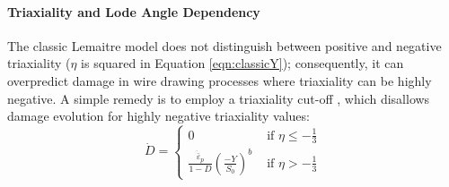 \documentclass[sn-mathphys,Numbered,draft]{sn-jnl}%
\begin{document}


\paragraph{Triaxiality and Lode Angle Dependency}

The classic Lemaitre model does not distinguish between positive and negative triaxiality ($\eta$ is squared in Equation \ref{eqn:classicY}); consequently, it can overpredict damage in wire drawing processes where triaxiality can be highly negative.
A simple remedy is to employ a triaxiality cut-off \cite{bouchard_enhanced_2011}, which disallows damage evolution for highly negative triaxiality values:
\begin{equation} \label{eq:triaxCutoff} %
	\dot{D} =
	\begin{cases}
		0 & \text { if } \eta \leq -\frac{1}{3}  \\
		\frac{\dot{\bar{\varepsilon}}_p}{1 - D}\left(\frac{-Y}{S_0}\right)^b 
		& \text { if } \eta>-\frac{1}{3}
	\end{cases}
\end{equation}




\end{document}
